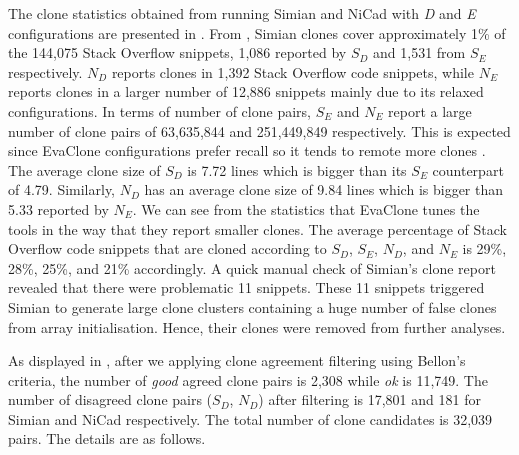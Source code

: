 \documentclass[sigconf,review, anonymous]{acmart}
\begin{document}
The clone statistics obtained from running Simian and NiCad with \textit{D} and \textit{E} configurations are presented in . From , Simian clones cover approximately 1\% of the 144,075 Stack Overflow snippets, 1,086 reported by $S_D$ and 1,531 from $S_E$ respectively. $N_D$ reports clones in 1,392 Stack Overflow code snippets, while $N_E$ reports clones in a larger number of 12,886 snippets  mainly due to its relaxed configurations. In terms of number of clone pairs, $S_E$ and $N_E$ report a large number of clone pairs of 63,635,844 and 251,449,849 respectively. This is expected since EvaClone configurations prefer recall so it tends to remote more clones \cite{Wang2013}. The average clone size of $S_D$ is 7.72 lines which is bigger than its $S_E$ counterpart of 4.79. Similarly, $N_D$ has an average clone size of 9.84 lines which is bigger than 5.33 reported by $N_E$. We can see from the statistics that EvaClone tunes the tools in the way that they report smaller clones. The average percentage of Stack Overflow code snippets that are cloned according to $S_D$, $S_E$, $N_D$, and $N_E$ is 29\%, 28\%, 25\%, and 21\% accordingly. A quick manual check of Simian's clone report revealed that there were problematic 11 snippets. These 11 snippets triggered Simian to generate large clone clusters containing a huge number of false clones from array initialisation. Hence, their clones were removed from further analyses. 

As displayed in , after we applying clone agreement filtering using Bellon's criteria, the number of \textit{good} agreed clone pairs is 2,308 while \textit{ok} is 11,749. The number of disagreed clone pairs ($S_D$, $N_D$) after filtering is 17,801 and 181 for Simian and NiCad respectively. The total number of clone candidates is 32,039 pairs. The details are as follows.
\end{document}
